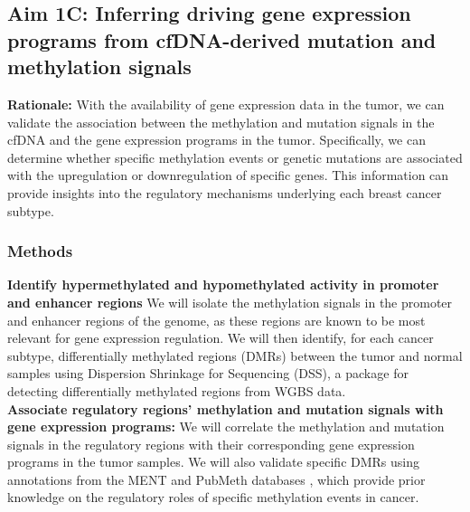 \documentclass[11pt]{article}
\begin{document}
\subsection*{Aim 1C: Inferring driving gene expression programs from cfDNA-derived mutation and methylation signals}
\textbf{Rationale:}
With the availability of gene expression data in the tumor, we can validate the association between the methylation and mutation signals in the cfDNA and the gene expression programs in the tumor. Specifically, we can determine whether specific methylation events or genetic mutations are associated with the upregulation or downregulation of specific genes. This information can provide insights into the regulatory mechanisms underlying each breast cancer subtype.
\subsubsection*{Methods}
\textbf{Identify hypermethylated and hypomethylated activity in promoter and enhancer regions} We will isolate the methylation signals in the promoter and enhancer regions of the genome, as these regions are known to be most relevant for gene expression regulation. 
We will then identify, for each cancer subtype, differentially methylated regions (DMRs) between the tumor and normal samples using Dispersion Shrinkage for Sequencing (DSS), a package for detecting differentially methylated regions from WGBS data. \cite{feng_differential_2019}
\medskip \\
\textbf{Associate regulatory regions' methylation and mutation signals with gene expression programs:} We will correlate the methylation and mutation signals in the regulatory regions with their corresponding gene expression programs in the tumor samples. We will also validate specific DMRs using annotations from the MENT and PubMeth databases \cite{zhang_unlocking_2023}, which provide prior knowledge on the regulatory roles of specific methylation events in cancer.
\end{document}
